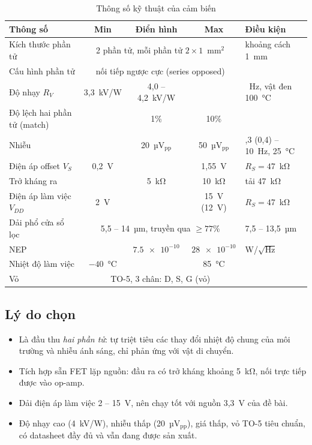\begin{table}[!htb]
\centering
\caption{Thông số kỹ thuật của cảm biến \PYD{}}
\label{tab:pyd1378}
\small
\begin{tabularx}{\textwidth}{@{}p{4.2cm}ccc>{\raggedright\arraybackslash}X@{}}
\toprule
\textbf{Thông số} & \textbf{Min} & \textbf{Điển hình} & \textbf{Max} & \textbf{Điều kiện} \\ \midrule
Kích thước phần tử & \multicolumn{3}{c}{2 phần tử, mỗi phần tử $2\times1$~mm$^2$} & khoảng cách 1~mm \\
Cấu hình phần tử & \multicolumn{3}{c}{nối tiếp ngược cực (series opposed)} & \\
Độ nhạy $R_V$ & 3,3~kV/W & 4,0 -- 4,2~kV/W & & 1~Hz, vật đen 100~°C \\
Độ lệch hai phần tử (match) & & 1\% & 10\% & \\
Nhiễu & & 20~µV$_\text{pp}$ & 50~µV$_\text{pp}$ & 0,3 (0,4) -- 10~Hz, 25~°C \\
Điện áp offset $V_S$ & 0,2~V & & 1,55~V & $R_S = 47$~kΩ \\
Trở kháng ra & & 5~kΩ & 10~kΩ & tải 47~kΩ \\
Điện áp làm việc $V_{DD}$ & 2~V & & 15~V (12~V) & $R_S = 47$~kΩ \\
Dải phổ cửa sổ lọc & \multicolumn{3}{c}{5,5 -- 14~µm, truyền qua $\ge 77$\%} & 7,5 -- 13,5~µm \\
NEP & & $\num{7.5e-10}$ & $\num{28e-10}$ & W/$\sqrt{\text{Hz}}$ \\
Nhiệt độ làm việc & $-40$~°C & & 85~°C & \\
Vỏ & \multicolumn{3}{c}{TO-5, 3 chân: D, S, G (vỏ)} & \\
\bottomrule
\end{tabularx}
\end{table}

\subsection{Lý do chọn \PYD{}}

\begin{itemize}
  \item Là đầu thu \emph{hai phần tử}: tự triệt tiêu các thay đổi nhiệt độ chung của môi trường và nhiễu ánh sáng, chỉ phản ứng với vật di chuyển.
  \item Tích hợp sẵn FET lặp nguồn: đầu ra có trở kháng khoảng 5~kΩ, nối trực tiếp được vào op-amp.
  \item Dải điện áp làm việc 2 -- 15~V, nên chạy tốt với nguồn 3,3~V của đề bài.
  \item Độ nhạy cao (4~kV/W), nhiễu thấp (20~µV$_\text{pp}$), giá thấp, vỏ TO-5 tiêu chuẩn, có datasheet đầy đủ và vẫn đang được sản xuất.
\end{itemize}

